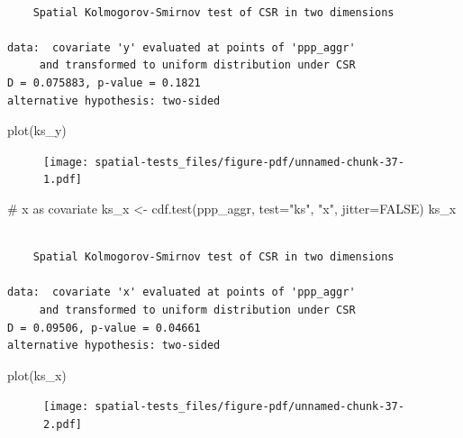 \documentclass[
  letterpaper,
]{book}
\newenvironment{Shaded}{\begin{snugshade}}{\end{snugshade}}
\newcommand{\AttributeTok}[1]{\textcolor[rgb]{0.40,0.45,0.13}{#1}}
\newcommand{\CommentTok}[1]{\textcolor[rgb]{0.37,0.37,0.37}{#1}}
\newcommand{\ConstantTok}[1]{\textcolor[rgb]{0.56,0.35,0.01}{#1}}
\newcommand{\FunctionTok}[1]{\textcolor[rgb]{0.28,0.35,0.67}{#1}}
\newcommand{\NormalTok}[1]{\textcolor[rgb]{0.00,0.23,0.31}{#1}}
\newcommand{\OtherTok}[1]{\textcolor[rgb]{0.00,0.23,0.31}{#1}}
\newcommand{\StringTok}[1]{\textcolor[rgb]{0.13,0.47,0.30}{#1}}
\begin{document}
\begin{verbatim}

    Spatial Kolmogorov-Smirnov test of CSR in two dimensions

data:  covariate 'y' evaluated at points of 'ppp_aggr' 
     and transformed to uniform distribution under CSR
D = 0.075883, p-value = 0.1821
alternative hypothesis: two-sided
\end{verbatim}

\begin{Shaded}
\begin{Highlighting}[]
\FunctionTok{plot}\NormalTok{(ks\_y)}
\end{Highlighting}
\end{Shaded}

\begin{figure}[H]

\texttt{[image: spatial-tests\_files/figure-pdf/unnamed-chunk-37-1.pdf]} \hfill{}

\end{figure}

\begin{Shaded}
\begin{Highlighting}[]
\CommentTok{\# x as covariate}
\NormalTok{ks\_x }\OtherTok{\textless{}{-}} \FunctionTok{cdf.test}\NormalTok{(ppp\_aggr, }\AttributeTok{test=}\StringTok{"ks"}\NormalTok{, }\StringTok{"x"}\NormalTok{, }\AttributeTok{jitter=}\ConstantTok{FALSE}\NormalTok{)}
\NormalTok{ks\_x}
\end{Highlighting}
\end{Shaded}

\begin{verbatim}

    Spatial Kolmogorov-Smirnov test of CSR in two dimensions

data:  covariate 'x' evaluated at points of 'ppp_aggr' 
     and transformed to uniform distribution under CSR
D = 0.09506, p-value = 0.04661
alternative hypothesis: two-sided
\end{verbatim}

\begin{Shaded}
\begin{Highlighting}[]
\FunctionTok{plot}\NormalTok{(ks\_x)}
\end{Highlighting}
\end{Shaded}

\begin{figure}[H]

\texttt{[image: spatial-tests\_files/figure-pdf/unnamed-chunk-37-2.pdf]} \hfill{}

\end{figure}
\end{document}
